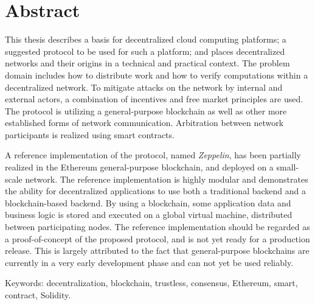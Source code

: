 
\thispagestyle{plain}			%
\section*{Abstract}
This thesis describes a basis for decentralized cloud computing platforms; a suggested protocol to be used for such a platform; and places decentralized networks and their origins in a technical and practical context. The problem domain includes how to distribute work and how to verify computations within a decentralized network. To mitigate attacks on the network by internal and external actors, a combination of incentives and free market principles are used. The protocol is utilizing a general-purpose blockchain as well as other more established forms of network communication. Arbitration between network participants is realized using smart contracts.

A reference implementation of the protocol, named \textit{Zeppelin}, has been partially realized in the Ethereum general-purpose blockchain, and deployed on a small-scale network. The reference implementation is highly modular and demonstrates the ability for decentralized applications to use both a traditional backend and a blockchain-based backend. By using a blockchain, some application data and business logic is stored and executed on a global virtual machine, distributed between participating nodes. The reference implementation should be regarded as a proof-of-concept of the proposed protocol, and is not yet ready for a production release. This is largely attributed to the fact that general-purpose blockchains are currently in a very early development phase and can not yet be used reliably.


\vfill
\noindent Keywords: decentralization, blockchain, trustless, consensus, Ethereum, smart, \\contract, Solidity. 

\newpage				%
\thispagestyle{empty}
\mbox{}